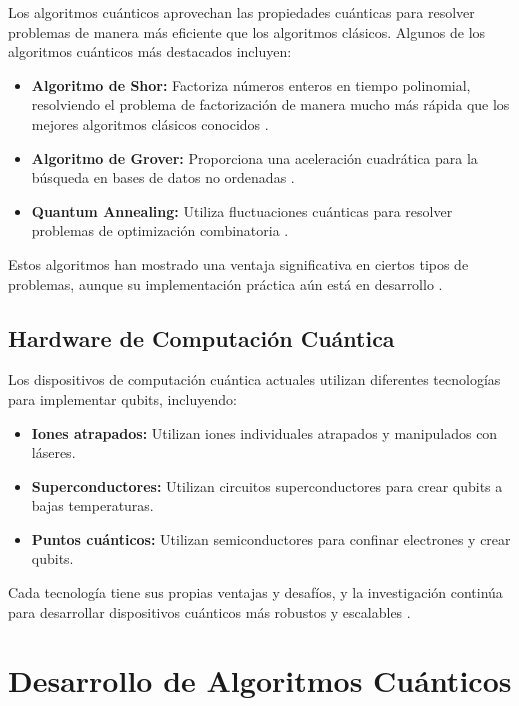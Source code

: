 \documentclass[11pt,a4paper,spanish]{book}
\begin{document}
\begin{itemize}
Los algoritmos cuánticos aprovechan las propiedades cuánticas para resolver problemas de manera más eficiente que los algoritmos clásicos. Algunos de los algoritmos cuánticos más destacados incluyen:

\begin{itemize}
	\item \textbf{Algoritmo de Shor:} Factoriza números enteros en tiempo polinomial, resolviendo el problema de factorización de manera mucho más rápida que los mejores algoritmos clásicos conocidos \cite{shorAlgorithm}.
	\item \textbf{Algoritmo de Grover:} Proporciona una aceleración cuadrática para la búsqueda en bases de datos no ordenadas \cite{groverAlgorithm}.
	\item \textbf{Quantum Annealing:} Utiliza fluctuaciones cuánticas para resolver problemas de optimización combinatoria \cite{farhiQuantum}.
\end{itemize}

Estos algoritmos han mostrado una ventaja significativa en ciertos tipos de problemas, aunque su implementación práctica aún está en desarrollo \cite{nielsenChuang}.

\subsection{Hardware de Computación Cuántica}

Los dispositivos de computación cuántica actuales utilizan diferentes tecnologías para implementar qubits, incluyendo:

\begin{itemize}
	\item \textbf{Iones atrapados:} Utilizan iones individuales atrapados y manipulados con láseres.
	\item \textbf{Superconductores:} Utilizan circuitos superconductores para crear qubits a bajas temperaturas.
	\item \textbf{Puntos cuánticos:} Utilizan semiconductores para confinar electrones y crear qubits.
\end{itemize}

Cada tecnología tiene sus propias ventajas y desafíos, y la investigación continúa para desarrollar dispositivos cuánticos más robustos y escalables \cite{gibneyQuantumTech}.

\section{Desarrollo de Algoritmos Cuánticos}


\end{itemize}
\end{document}
